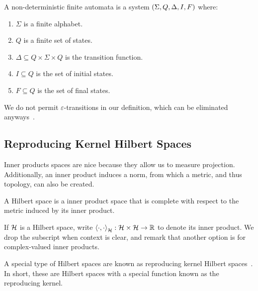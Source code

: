 \documentclass[12pt]{article}
\begin{document}
\begin{definition}
  A non-deterministic finite automata is a system
  \(\left(\Sigma, Q, \Delta, I, F\right)\) where:

  \begin{enumerate}
    \item
      \(\Sigma\) is a finite alphabet.

    \item
      \(Q\) is a finite set of states.

    \item
      \(\Delta \subseteq Q \times \Sigma \times Q\)
      is the transition function.

    \item
      \(I \subseteq Q\) is the set of initial states.

    \item
      \(F \subseteq Q\) is the set of final states.

  \end{enumerate}
\end{definition}

We do not permit \(\varepsilon\)-transitions in our definition,
which can be eliminated anyways~\cite{savage1998models}.



\subsection{Reproducing Kernel Hilbert Spaces}

Inner products spaces are nice because they allow us to measure projection.
Additionally, an inner product induces a norm, from which a metric,
and thus topology, can also be created.

\begin{definition}
  A Hilbert space is a inner product space that is complete with respect
  to the metric induced by its inner product.
\end{definition}

If \(\mathcal{H}\) is a Hilbert space,
write
\(\left\langle\cdot, \cdot\right\rangle_{\mathcal{H}} : \mathcal{H} \times \mathcal{H} \to \mathbb{R}\)
to denote its inner product.
We drop the subscript when context is clear,
and remark that another option is for complex-valued inner products.

A special type of Hilbert spaces are known as
reproducing kernel Hilbert spaces~\cite{berlinet2011reproducing}.
In short,
these are Hilbert spaces with a special function known
as the reproducing kernel.
\end{document}
